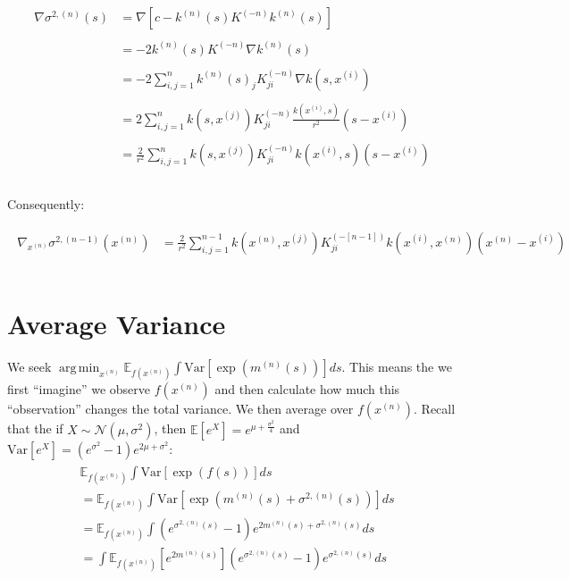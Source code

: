 \documentclass[paper=a4, fontsize=11pt]{scrartcl} %
\DeclareMathOperator*{\argmin}{arg\,min}
\numberwithin{equation}{section} %
\numberwithin{figure}{section} %
\numberwithin{table}{section} %
\newcommand{\en}{\mathbb{E}_{f(\xn)}}
\newcommand{\var}{\text{Var}}
\newcommand{\gxn}{\nabla_{x^{(n)}}} %
\newcommand{\xn}{x^{(n)}} %
\newcommand{\xj}{x^{(j)}}
\newcommand{\xii}{x^{(i)}}
\newcommand{\mn}{m^{(n)}}
\newcommand{\kn}{k^{(n)}}
\newcommand{\Kinvn}{K^{(-n)}} %
\newcommand{\Kinvnm}{K^{(-[n-1])}}
\newcommand{\sqn}{\sigma ^{2 , (n)}     }
\newcommand{\signxn}{\sigma^{2, (n-1)} (\xn)}
\begin{document}
\begin{align}
 \begin{split}
  \nabla \sqn (s) &= \nabla [ c - \kn(s) \Kinvn \kn(s)]\\\\
%
%
%
&= -2 \kn(s) \Kinvn \nabla\kn(s)\\\\
%
%
%
&= -2 \sum_{i,j=1}^{n} \kn(s)_j \Kinvn_{ji} \nabla k (s, \xii )\\\\
%
%
%
&= 2 \sum_{i,j=1}^{n} k(s,\xj) \Kinvn_{ji} \frac{k(\xii ,s)}{r^2} (s-\xii)\\\\
%
%
%
&= \frac{2}{r^2} \sum_{i,j=1}^{n} k(s,\xj) \Kinvn_{ji} k(\xii ,s) (s-\xii)\\\\
 \end{split}
\end{align}

Consequently:

\begin{align}
 \begin{split}
  \gxn \signxn &= \frac{2}{r^2} \sum_{i,j=1}^{n-1} k(\xn,\xj) \Kinvnm_{ji} k(\xii ,\xn) (\xn-\xii)\\\\
 \end{split}
\end{align}


%

\section{Average Variance}
We seek $\argmin_{\xn} \en\int  \var[ \exp( \mn(s) )] ds$. This means the we first ``imagine'' we observe $f(\xn)$ and
then calculate how much this ``observation'' changes the total variance. We then average over $f(\xn)$.
Recall that the if $X \sim \mathcal{N}(\mu, \sigma^2)$, then $\mathbb{E}[e^X] = e^{\mu + \frac{\sigma^2}{4}}$ and 
$\var[e^X] = (e^{\sigma^2} - 1) e^{2\mu + \sigma^2}$:
\begin{align}
\begin{split}
%
&\en\int  \var[ \exp( f(s) )] ds  \\
%
&=\en\int  \var[ \exp( \mn(s) + \sqn(s) )] ds  \\
&=\en\int (e^{\sqn(s)} -1) e^{2\mn(s)+\sqn(s)}ds\\
%
%
&=\int \en[e^{2\mn(s)}] (e^{\sqn(s)} -1) e^{\sqn(s)}ds\\
\end{split}
\end{align}
\end{document}
